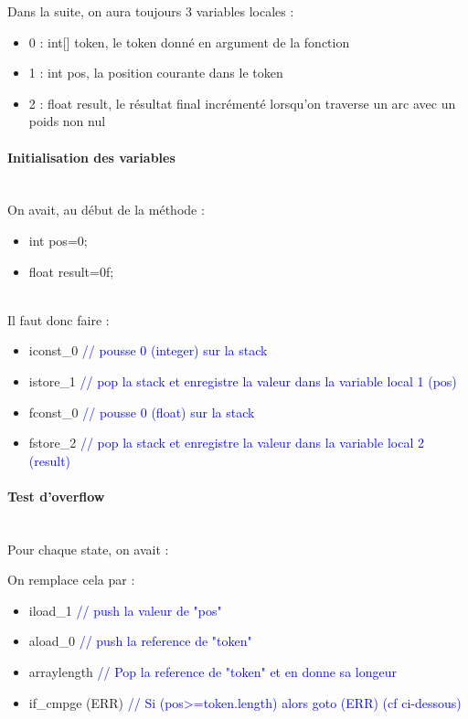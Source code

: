 Dans la suite, on aura toujours 3 variables locales :
\begin{itemize}
    \item 0 : int[] token, le token donné en argument de la fonction
    \item 1 : int pos, la position courante dans le token
    \item 2 : float result, le résultat final incrémenté lorsqu'on traverse un arc avec un poids non nul
\end{itemize}

\paragraph{Initialisation des variables}
~\\
On avait, au début de la méthode :
\begin{itemize}
    \item int pos=0;
    \item float result=0f;
\end{itemize}
~\\

Il faut donc faire :
\begin{itemize}
    \item iconst\_0  \textcolor{blue}{// pousse 0 (integer) sur la stack}
    \item istore\_1  \textcolor{blue}{// pop la stack et enregistre la valeur dans la variable local 1 (pos)}
    \item fconst\_0  \textcolor{blue}{// pousse 0 (float) sur la stack}
        \item fstore\_2  \textcolor{blue}{// pop la stack et enregistre la valeur dans la variable local 2 (result)}
\end{itemize}

\paragraph{Test d'overflow}
~\\
Pour chaque state, on avait :



On remplace cela par :
\begin{itemize}
    \item iload\_1 \textcolor{blue}{// push la valeur de "pos"}
    \item aload\_0 \textcolor{blue}{// push la reference de "token"}
    \item arraylength \textcolor{blue}{// Pop la reference de "token" et en donne sa longeur}
    \item if\_cmpge (ERR) \textcolor{blue}{// Si (pos>=token.length) alors goto (ERR) (cf ci-dessous)}
\end{itemize}

